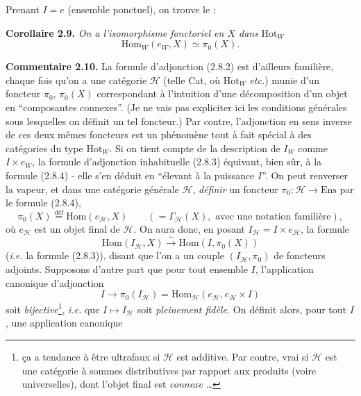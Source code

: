\documentclass[11pt]{article}
\newcommand{\msp}[1]{\marginpar{\footnotesize [#1]}}
\begin{document}
Prenant $I = e$ (ensemble ponctuel), on trouve le :

\textbf{Corollaire 2.9.} \textit{On a l'isomorphisme fonctoriel en $X$ dans} $\mathrm{Hot}_W$
\[
\boxed{\mathrm{Hom}_W(e_W, X) \simeq \pi_0(X).} \tag*{(2.8.4)}
\]

\textbf{Commentaire 2.10.} La formule d'adjonction (2.8.2) est d'ailleurs familière, chaque fois qu'on a une catégorie $\mathcal{H}$ (telle Cat, où $\mathrm{Hot}_W$ \textit{etc.}) %
munie d'un foncteur $\pi_0$, $\pi_0(X)$ correspondant à l'intuition d'une décomposition d'un objet en “composantes connexes”. (Je ne vais pas expliciter ici les conditions générales sous lesquelles on définit un tel foncteur.) Par contre, l'adjonction en sens inverse de ces deux mêmes foncteurs est un phénomène tout à fait spécial à des catégories \msp{page 16}du type $\mathrm{Hot}_W$. Si on tient compte de la description de $I_W$ comme $I \times e_W$, la formule d'adjonction inhabituelle (2.8.3) équivaut, bien sûr, à la formule (2.8.4) - elle s'en déduit en “élevant à la puissance $I$”. On peut renverser la vapeur, et dans une catégorie générale $\mathcal{H}$, \textit{définir} un foncteur $\pi_0 : \mathcal{H} \longrightarrow \mathrm{Ens}$ par le formule (2.8.4), %
\[
\pi_0(X) \overset{\text{déf}}{=} \mathrm{Hom}(e_{\mathcal{H}}, X) \qquad (= \Gamma_{\mathcal{H}}(X), \text{ avec une notation familière}),
\]
où $e_{\mathcal{H}}$ est un objet final de $\mathcal{H}$. On aura donc, en posant $I_{\mathcal{H}} = I \times e_{\mathcal{H}}$, la formule
\[
\mathrm{Hom}(I_{\mathcal{H}}, X) \xrightarrow{\ \sim\ } \mathrm{Hom}(I, \pi_0(X))
\]
(\textit{i.e.} la formule (2.8.3)), disant que l'on a un couple $(I_{\mathcal{H}}, \pi_0)$ de foncteurs adjoints. Supposons d'autre part que pour tout ensemble $I$, l'application canonique d'adjonction
\[
I \longrightarrow \pi_0(I_{\mathcal{H}}) = \mathrm{Hom}_{\mathcal{H}}(e_{\mathcal{H}}, e_{\mathcal{H}} \times I)
\]
soit \textit{bijective}\footnote{ça a tendance à être ultrafaux si $\mathcal{H}$ est additive. Par contre, vrai si $\mathcal{H}$ est une catégorie à sommes distributives par rapport aux produits (voire universelles), dont l'objet final est \textit{connexe} \ldots}, \textit{i.e.} que $I \longmapsto I_{\mathcal{H}}$ soit \textit{pleinement fidèle.} On définit alors, pour tout $I$, une application canonique
\end{document}
